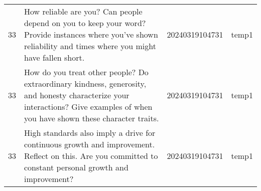 \begin{longtable}{rlll}
 33 &                                                                                                                                                                                                                                                                                                                                                                                                                                                                                                                                                                                                                                                                                                                                                                                                     How reliable are you? Can people depend on you to keep your word? Provide instances where you've shown reliability and times where you might have fallen short. & 20240319104731 &       temp1 \\
 33 &                                                                                                                                                                                                                                                                                                                                                                                                                                                                                                                                                                                                                                                                                                                                                                                      How do you treat other people? Do extraordinary kindness, generosity, and honesty characterize your interactions? Give examples of when you have shown these character traits. & 20240319104731 &       temp1 \\
 33 &                                                                                                                                                                                                                                                                                                                                                                                                                                                                                                                                                                                                                                                                                                                                                                                                            High standards also imply a drive for continuous growth and improvement. Reflect on this. Are you committed to constant personal growth and improvement? & 20240319104731 &       temp1 \\

\end{longtable}
